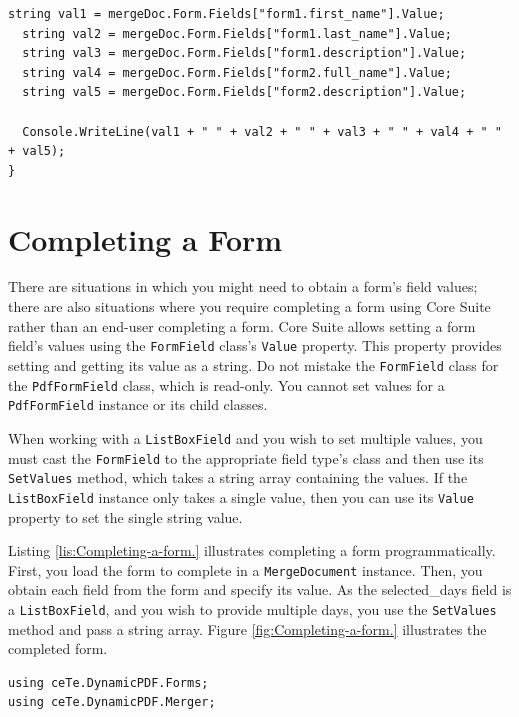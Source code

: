 \documentclass[american,letterpaper]{tufte-book}
\numberwithin{equation}{section}
\numberwithin{figure}{section}
\begin{document}
{{\begin{lstlisting}[caption={Reading two forms.},label={lis:Reading-two-forms.},basicstyle={\small\ttfamily},breaklines=true]
  string val1 = mergeDoc.Form.Fields["form1.first_name"].Value;
  string val2 = mergeDoc.Form.Fields["form1.last_name"].Value;
  string val3 = mergeDoc.Form.Fields["form1.description"].Value;
  string val4 = mergeDoc.Form.Fields["form2.full_name"].Value;
  string val5 = mergeDoc.Form.Fields["form2.description"].Value;

  Console.WriteLine(val1 + " " + val2 + " " + val3 + " " + val4 + " " + val5);
}
\end{lstlisting}
\leavevmode\egroup


\section{Completing a Form}

There are situations in which you might need to obtain a form's field
values; there are also situations where you require completing a form
using Core Suite rather than an end-user completing a form. Core Suite
allows setting a form field's values using the \texttt{FormField}
class's \texttt{Value} property. This property provides setting and
getting its value as a string. Do not mistake the \texttt{FormField}
class for the \texttt{PdfFormField} class, which is read-only. You
cannot set values for a \texttt{PdfFormField} instance or its child
classes.

When working with a \texttt{ListBoxField} and you wish to set multiple
values, you must cast the \texttt{FormField} to the appropriate field
type's class and then use its \texttt{SetValues} method, which takes
a string array containing the values. If the \texttt{ListBoxField}
instance only takes a single value, then you can use its \texttt{Value}
property to set the single string value.

Listing \ref{lis:Completing-a-form.} illustrates completing a form
programmatically. First, you load the form to complete in a \texttt{MergeDocument}
instance. Then, you obtain each field from the form and specify its
value. As the selected\_days field is a \texttt{ListBoxField}, and
you wish to provide multiple days, you use the \texttt{SetValues}
method and pass a string array. Figure \ref{fig:Completing-a-form.}
illustrates the completed form.

\bgroup{}
\begin{lstlisting}[caption={Completing a form.},label={lis:Completing-a-form.},basicstyle={\small\ttfamily},breaklines=true]
using ceTe.DynamicPDF.Forms;
using ceTe.DynamicPDF.Merger;


\end{lstlisting}}}
\end{document}
